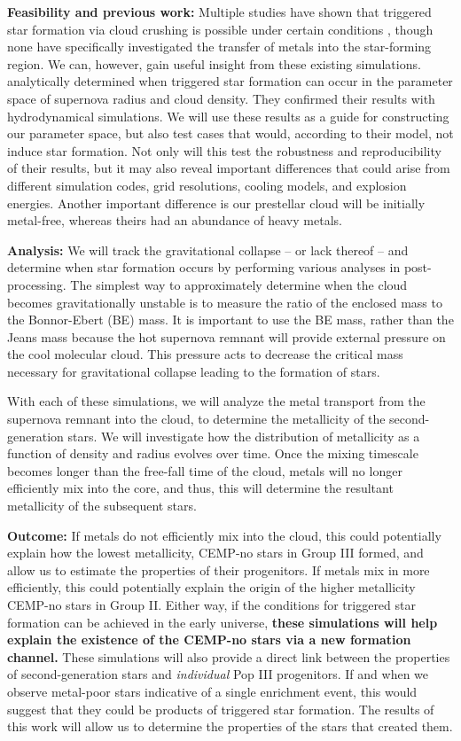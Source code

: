 \documentclass[letterpaper, 12pt]{article}
\begin{document}
\textbf{Feasibility and previous work:} Multiple studies have shown that triggered star formation via cloud crushing is possible under certain conditions \citep{Melioli2006, Leao2009}, though none have specifically investigated the transfer of metals into the star-forming region. We can, however, gain useful insight from these existing simulations. \cite{Melioli2006} analytically determined when triggered star formation can occur in the parameter space of supernova radius and cloud density. They confirmed their results with hydrodynamical simulations. We will use these results as a guide for constructing our parameter space, but also test cases that would, according to their model, not induce star formation. Not only will this test the robustness and reproducibility of their results, but it may also reveal important differences that could arise from different simulation codes, grid resolutions, cooling models, and explosion energies. Another important difference is our prestellar cloud will be initially metal-free, whereas theirs had an abundance of heavy metals.

\textbf{Analysis:} We will track the gravitational collapse -- or lack thereof -- and determine when star formation occurs by performing various analyses in post-processing. The simplest way to approximately determine when the cloud becomes gravitationally unstable is to measure the ratio of the enclosed mass to the Bonnor-Ebert (BE) mass. It is important to use the BE mass, rather than the Jeans mass because the hot supernova remnant will provide external pressure on the cool molecular cloud. This pressure acts to decrease the critical mass necessary for gravitational collapse leading to the formation of stars.

With each of these simulations, we will analyze the metal transport from the supernova remnant into the cloud, to determine the metallicity of the second-generation stars. We will investigate how the distribution of metallicity as a function of density and radius evolves over time. Once the mixing timescale becomes longer than the free-fall time of the cloud, metals will no longer efficiently mix into the core, and thus, this will determine the resultant metallicity of the subsequent stars. 

\textbf{Outcome:} If metals do not efficiently mix into the cloud, this could potentially explain how the lowest metallicity, CEMP-no stars in Group III formed, and allow us to estimate the properties of their progenitors. If metals mix in more efficiently, this could potentially explain the origin of the higher metallicity CEMP-no stars in Group II. Either way, if the conditions for triggered star formation can be achieved in the early universe, \textbf{these simulations will help explain the existence of the CEMP-no stars via a new formation channel.} These simulations will also provide a direct link between the properties of second-generation stars and \textit{individual} Pop III progenitors. If and when we observe metal-poor stars indicative of a single enrichment event, this would suggest that they could be products of triggered star formation. The results of this work will allow us to determine the properties of the stars that created them.
\end{document}
